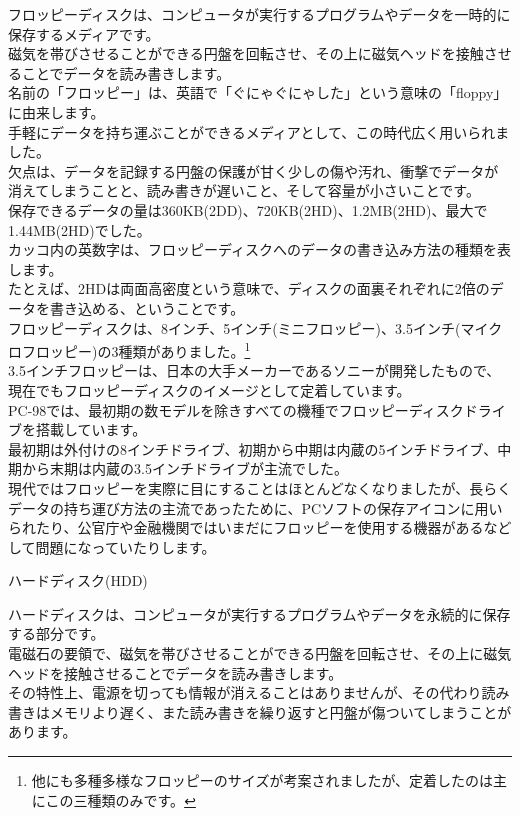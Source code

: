 \documentclass[b5paper,9pt,platex,dvipdfmx]{jsarticle}
\begin{document}
\begin{multicols}{3}
\begin{enumerate}
  フロッピーディスクは、コンピュータが実行するプログラムやデータを一時的に保存するメディアです。\\
  磁気を帯びさせることができる円盤を回転させ、その上に磁気ヘッドを接触させることでデータを読み書きします。\\
  名前の「フロッピー」は、英語で「ぐにゃぐにゃした」という意味の「floppy」に由来します。\\
  手軽にデータを持ち運ぶことができるメディアとして、この時代広く用いられました。\\
  欠点は、データを記録する円盤の保護が甘く少しの傷や汚れ、衝撃でデータが消えてしまうことと、読み書きが遅いこと、そして容量が小さいことです。\\
  保存できるデータの量は360KB(2DD)、720KB(2HD)、1.2MB(2HD)、最大で1.44MB(2HD)でした。\\
  カッコ内の英数字は、フロッピーディスクへのデータの書き込み方法の種類を表します。\\
  たとえば、2HDは両面高密度という意味で、ディスクの面裏それぞれに2倍のデータを書き込める、ということです。\\
  フロッピーディスクは、8インチ、5インチ(ミニフロッピー)、3.5インチ(マイクロフロッピー)の3種類がありました。\footnote{他にも多種多様なフロッピーのサイズが考案されましたが、定着したのは主にこの三種類のみです。}\\
  3.5インチフロッピーは、日本の大手メーカーであるソニーが開発したもので、現在でもフロッピーディスクのイメージとして定着しています。\\
  PC-98では、最初期の数モデルを除きすべての機種でフロッピーディスクドライブを搭載しています。\\
  最初期は外付けの8インチドライブ、初期から中期は内蔵の5インチドライブ、中期から末期は内蔵の3.5インチドライブが主流でした。\\
  現代ではフロッピーを実際に目にすることはほとんどなくなりましたが、長らくデータの持ち運び方法の主流であったために、PCソフトの保存アイコンに用いられたり、公官庁や金融機関ではいまだにフロッピーを使用する機器があるなどして問題になっていたりします。
  {\bf  \item ハードディスク(HDD)\\}
  ハードディスクは、コンピュータが実行するプログラムやデータを永続的に保存する部分です。\\
  電磁石の要領で、磁気を帯びさせることができる円盤を回転させ、その上に磁気ヘッドを接触させることでデータを読み書きします。\\
  その特性上、電源を切っても情報が消えることはありませんが、その代わり読み書きはメモリより遅く、また読み書きを繰り返すと円盤が傷ついてしまうことがあります。\\

\end{enumerate}
\end{multicols}
\end{document}
